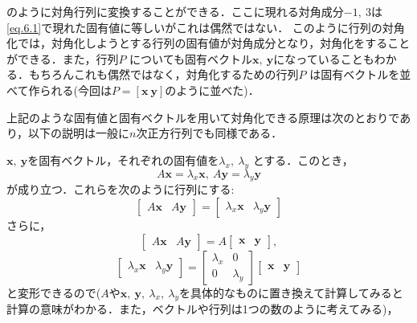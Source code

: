 \documentclass[a4paper,12pt,autodetect-engine,dvipdfmx]{jsarticle}
\theoremstyle{definition}
\begin{document}
のように対角行列に変換することができる．ここに現れる対角成分$-1,\ 3$は\eqref{eq.6.1}で現れた固有値に等しいがこれは偶然ではない．
このように行列の対角化では，対角化しようとする行列の固有値が対角成分となり，対角化をすることができる．また，行列$P$
についても固有ベクトル$\bm{x},\ \bm{y}$になっていることもわかる．もちろんこれも偶然ではなく，対角化するための行列$P$
は固有ベクトルを並べて作られる(今回は$P=[\bm{x}\ \bm{y}]$のように並べた)．

上記のような固有値と固有ベクトルを用いて対角化できる原理は次のとおりであり，以下の説明は一般に$n$次正方行列でも同様である．

$\bm{x},\ \bm{y}$を固有ベクトル，それぞれの固有値を$\lambda_{x},\ \lambda_{y}$
とする．このとき，
\begin{equation*}
    A\bm{x} = \lambda_{x}\bm{x},\ A\bm{y} = \lambda_{y}\bm{y}
\end{equation*}
が成り立つ．これらを次のように行列にする:
\begin{equation*}
    \begin{bmatrix}
        A\bm{x} & A\bm{y}
    \end{bmatrix}
    =
    \begin{bmatrix}
        \lambda_{x}\bm{x} & \lambda_{y}\bm{y}
    \end{bmatrix}
\end{equation*}
さらに，
\begin{equation*}
    \begin{bmatrix}
        A\bm{x} & A\bm{y}
    \end{bmatrix}
    =
    A
    \begin{bmatrix}
        \bm{x} & \bm{y}
    \end{bmatrix},
\end{equation*}
\begin{equation*}
    \begin{bmatrix}
        \lambda_{x}\bm{x} & \lambda_{y}\bm{y}
    \end{bmatrix}
    =
    \begin{bmatrix}
        \lambda_{x} & 0\\
        0 & \lambda_{y}
    \end{bmatrix}
    \begin{bmatrix}
        \bm{x} & \bm{y}
    \end{bmatrix}
\end{equation*}
と変形できるので($A$や$\bm{x},\ \bm{y},\ \lambda_{x},\ \lambda_{y}$を具体的なものに置き換えて計算してみると計算の意味がわかる．また，ベクトルや行列は1つの数のように考えてみる)，
\end{document}
